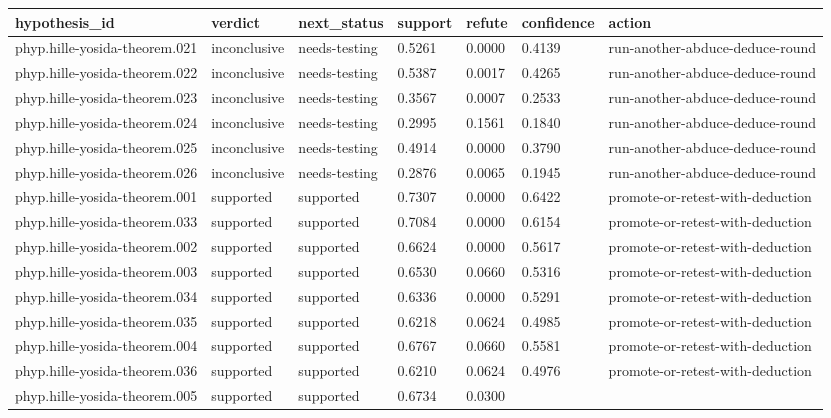 \documentclass[
]{article}
\newcounter{none} %
\begin{document}
{\def\LTcaptype{none} %
\begin{longtable}[]{@{}lllllll@{}}
\toprule\noalign{}
hypothesis\_id & verdict & next\_status & support & refute & confidence
& action \\
\midrule\noalign{}
\endhead
\bottomrule\noalign{}
\endlastfoot
phyp.hille-yosida-theorem.021 & inconclusive & needs-testing & 0.5261 &
0.0000 & 0.4139 & run-another-abduce-deduce-round \\
phyp.hille-yosida-theorem.022 & inconclusive & needs-testing & 0.5387 &
0.0017 & 0.4265 & run-another-abduce-deduce-round \\
phyp.hille-yosida-theorem.023 & inconclusive & needs-testing & 0.3567 &
0.0007 & 0.2533 & run-another-abduce-deduce-round \\
phyp.hille-yosida-theorem.024 & inconclusive & needs-testing & 0.2995 &
0.1561 & 0.1840 & run-another-abduce-deduce-round \\
phyp.hille-yosida-theorem.025 & inconclusive & needs-testing & 0.4914 &
0.0000 & 0.3790 & run-another-abduce-deduce-round \\
phyp.hille-yosida-theorem.026 & inconclusive & needs-testing & 0.2876 &
0.0065 & 0.1945 & run-another-abduce-deduce-round \\
phyp.hille-yosida-theorem.001 & supported & supported & 0.7307 & 0.0000
& 0.6422 & promote-or-retest-with-deduction \\
phyp.hille-yosida-theorem.033 & supported & supported & 0.7084 & 0.0000
& 0.6154 & promote-or-retest-with-deduction \\
phyp.hille-yosida-theorem.002 & supported & supported & 0.6624 & 0.0000
& 0.5617 & promote-or-retest-with-deduction \\
phyp.hille-yosida-theorem.003 & supported & supported & 0.6530 & 0.0660
& 0.5316 & promote-or-retest-with-deduction \\
phyp.hille-yosida-theorem.034 & supported & supported & 0.6336 & 0.0000
& 0.5291 & promote-or-retest-with-deduction \\
phyp.hille-yosida-theorem.035 & supported & supported & 0.6218 & 0.0624
& 0.4985 & promote-or-retest-with-deduction \\
phyp.hille-yosida-theorem.004 & supported & supported & 0.6767 & 0.0660
& 0.5581 & promote-or-retest-with-deduction \\
phyp.hille-yosida-theorem.036 & supported & supported & 0.6210 & 0.0624
& 0.4976 & promote-or-retest-with-deduction \\
phyp.hille-yosida-theorem.005 & supported & supported & 0.6734 & 0.0300

\end{longtable}}
\end{document}
